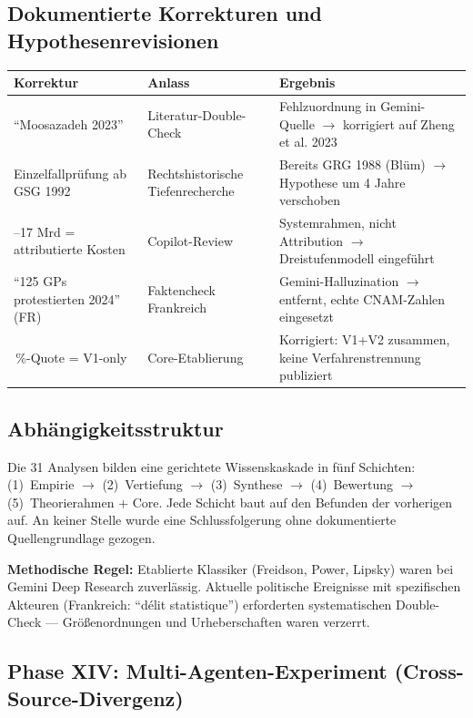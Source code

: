 \documentclass{umbruch-position}
\begin{document}
\subsection*{Dokumentierte Korrekturen und Hypothesenrevisionen}

{\small
\begin{tabularx}{\textwidth}{X X X}
\toprule
\textbf{Korrektur} & \textbf{Anlass} & \textbf{Ergebnis} \\
\midrule
``Moosazadeh 2023'' & Literatur-Double-Check & Fehlzuordnung in Gemini-Quelle $\to$ korrigiert auf Zheng et al. 2023 \\
\addlinespace
Einzelfallprüfung ab GSG 1992 & Rechtshistorische Tiefenrecherche & Bereits GRG 1988 (Blüm) $\to$ Hypothese um 4 Jahre verschoben \\
\addlinespace
7--17 Mrd = attributierte Kosten & Copilot-Review & Systemrahmen, nicht Attribution $\to$ Dreistufenmodell eingeführt \\
\addlinespace
``125 GPs protestierten 2024'' (FR) & Faktencheck Frankreich & Gemini-Halluzination $\to$ entfernt, echte CNAM-Zahlen eingesetzt \\
\addlinespace
1\,\%-Quote = V1-only & Core-Etablierung & Korrigiert: V1+V2 zusammen, keine Verfahrenstrennung publiziert \\
\bottomrule
\end{tabularx}
}

\subsection*{Abhängigkeitsstruktur}

Die 31 Analysen bilden eine gerichtete Wissenskaskade in fünf Schichten: (1)~Empirie $\to$ (2)~Vertiefung $\to$ (3)~Synthese $\to$ (4)~Bewertung $\to$ (5)~Theorierahmen + Core. Jede Schicht baut auf den Befunden der vorherigen auf. An keiner Stelle wurde eine Schlussfolgerung ohne dokumentierte Quellengrundlage gezogen.

\textbf{Methodische Regel:} Etablierte Klassiker (Freidson, Power, Lipsky) waren bei Gemini Deep Research zuverlässig. Aktuelle politische Ereignisse mit spezifischen Akteuren (Frankreich: ``d\'elit statistique'') erforderten systematischen Double-Check --- Größenordnungen und Urheberschaften waren verzerrt.

\subsection*{Phase XIV: Multi-Agenten-Experiment (Cross-Source-Divergenz)}
\end{document}
